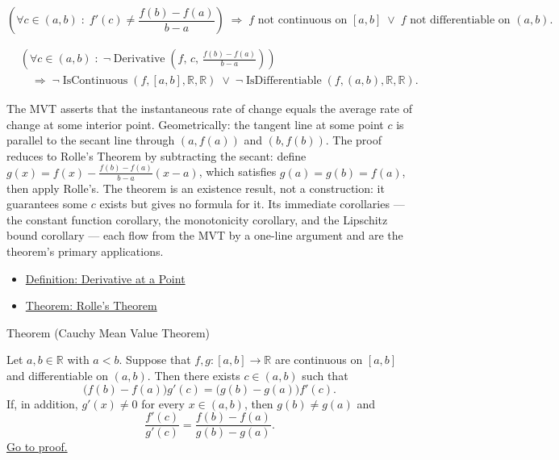 \begin{remark*}[Interpretation]
\[
\left(\forall c \in (a,b)\;:\; f'(c) \ne \frac{f(b)-f(a)}{b-a}\right)
\;\Rightarrow\;
f \text{ not continuous on } [a,b]
\;\lor\;
f \text{ not differentiable on } (a,b).
\]


\begin{align*}
&\left(\forall c\in(a,b)\;:\;\neg\operatorname{Derivative}\!\left(f,\,c,\,\tfrac{f(b)-f(a)}{b-a}\right)\right)\\
&\quad\Longrightarrow\;
\neg\operatorname{IsContinuous}(f,[a,b],\mathbb{R},\mathbb{R})
\;\lor\;
\neg\operatorname{IsDifferentiable}(f,(a,b),\mathbb{R},\mathbb{R}).
\end{align*}


The MVT asserts that the instantaneous rate of change equals the average rate of change at some interior point. Geometrically: the tangent line at some point $c$ is parallel to the secant line through $(a,f(a))$ and $(b,f(b))$. The proof reduces to Rolle's Theorem by subtracting the secant: define $g(x) = f(x) - \tfrac{f(b)-f(a)}{b-a}(x-a)$, which satisfies $g(a)=g(b)=f(a)$, then apply Rolle's. The theorem is an existence result, not a construction: it guarantees some $c$ exists but gives no formula for it. Its immediate corollaries --- the constant function corollary, the monotonicity corollary, and the Lipschitz bound corollary --- each flow from the MVT by a one-line argument and are the theorem's primary applications.
\end{remark*}

\begin{dependencies}
\begin{itemize}
  \item \hyperref[def:derivative-at-a-point]{Definition: Derivative at a Point}
  \item \hyperref[thm:rolles-theorem]{Theorem: Rolle's Theorem}
\end{itemize}
\end{dependencies}


\begin{theorembox}{Theorem (Cauchy Mean Value Theorem)}
\begin{theorem}
\label{thm:cauchy-mean-value-theorem}
Let $a,b\in\mathbb{R}$ with $a<b$. Suppose that $f,g:[a,b]\to\mathbb{R}$ are continuous on $[a,b]$ and differentiable on $(a,b)$. Then there exists $c\in(a,b)$ such that
\[
  \bigl(f(b)-f(a)\bigr)g'(c)
  =
  \bigl(g(b)-g(a)\bigr)f'(c).
\]
If, in addition, $g'(x)\neq 0$ for every $x\in(a,b)$, then $g(b)\neq g(a)$ and
\[
  \frac{f'(c)}{g'(c)}
  =
  \frac{f(b)-f(a)}{g(b)-g(a)}.
\]
\hyperref[prf:cauchy-mean-value-theorem]{Go to proof.}
\end{theorem}
\end{theorembox}

